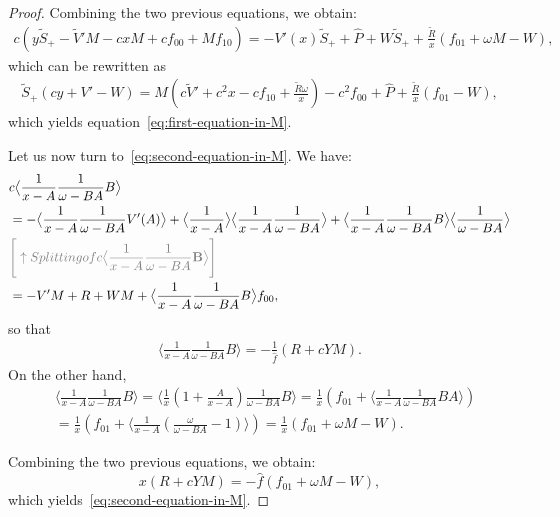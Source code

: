 \documentclass[10pt,a4paper]{amsart}
\newcommand\brak[1]{\big \langle #1 \big\rangle}
\newcommand{\gr}[1]{{\color{gray} #1}}
\begin{document}
\begin{proof}
Combining the two previous equations, we obtain:
\begin{align*}
    c\left(y\widetilde{S}_+ - \widetilde{V}'M - cxM + cf_{00} + Mf_{10}\right) = -V'(x)\widetilde{S}_++\widehat{P}+W\widetilde{S}_++\frac{\widetilde{R}}{x}\left(f_{01} + \omega M - W\right),
\end{align*}
which can be rewritten as
\begin{align*}
    \widetilde{S}_+(cy + V' - W) = M\left(c\widetilde{V}'+c^2x-cf_{10}+\frac{\widetilde{R}\omega}{x}\right) - c^2f_{00} + \widehat{P} + \frac{\widetilde{R}}{x}(f_{01}-W),
\end{align*}
which yields equation~\eqref{eq:first-equation-in-M}. 

Let us now turn to~\eqref{eq:second-equation-in-M}. We have:
\begin{align*}
&c\brak{\frac{1}{x-A}\frac{1}{\omega-BA}B} \\
&= -\brak{\frac{1}{x-A}\frac{1}{\omega-BA}V'(A)} + \brak{\frac{1}{x-A}}\brak{\frac{1}{x-A}\frac{1}{\omega-BA}} + \brak{\frac{1}{x-A}\frac{1}{\omega-BA}B}\brak{\frac{1}{\omega-BA}}\\
&\gr{\Bigg[\uparrow\textnormal{Splitting of } c\brak{\frac{1}{x-A}\frac{1}{\omega-BA}\mathbf{B}}\Bigg]}\\
&=- V'M + R + WM +\brak{\frac{1}{x-A}\frac{1}{\omega-BA}B}f_{00},
\end{align*}
so that
\begin{align*}
    \brak{\frac{1}{x-A}\frac{1}{\omega-BA}B} = -\frac{1}{\widehat{f}}(R+cYM).
\end{align*}
On the other hand,
\begin{align*}
    &\brak{\frac{1}{x-A}\frac{1}{\omega-BA}B} = \brak{\frac{1}{x}\left(1+\frac{A}{x-A}\right)\frac{1}{\omega-BA}B} = \frac{1}{x}\left(f_{01} + \brak{\frac{1}{x-A}\frac{1}{\omega-BA}BA}\right) \\
    &= \frac{1}{x}\left(f_{01} + \brak{\frac{1}{x-A}\left(\frac{\omega}{\omega-BA}-1\right)}\right)= \frac{1}{x}\left(f_{01}+\omega M - W\right).
\end{align*}

Combining the two previous equations, we obtain:
\begin{equation*}
    x(R + cYM) = -\widehat{f}(f_{01}+\omega M - W),
\end{equation*}
which yields~\eqref{eq:second-equation-in-M}.

\end{proof}
\end{document}
